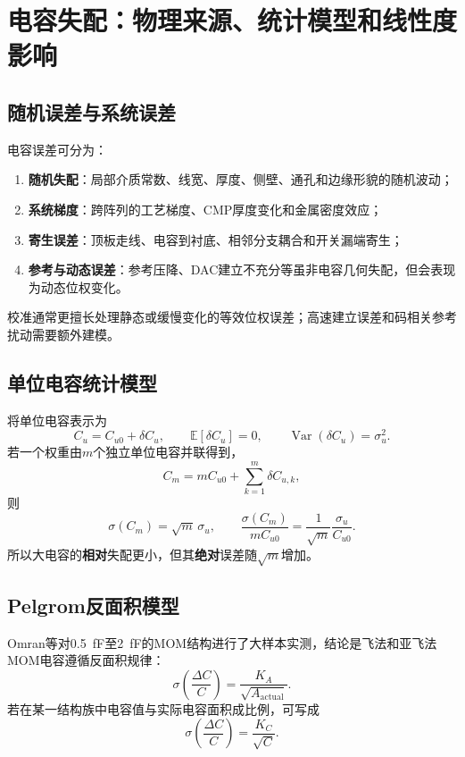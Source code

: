 \documentclass[UTF8,a4paper,11pt]{ctexart}
\newcommand{\sigc}{\sigma\!\left(\frac{\Delta C}{C}\right)}
\newcommand{\E}{\mathbb{E}}
\newcommand{\Var}{\operatorname{Var}}
\begin{document}
\section{电容失配：物理来源、统计模型和线性度影响}

\subsection{随机误差与系统误差}

电容误差可分为：
\begin{enumerate}
  \item \textbf{随机失配}：局部介质常数、线宽、厚度、侧壁、通孔和边缘形貌的随机波动；
  \item \textbf{系统梯度}：跨阵列的工艺梯度、CMP厚度变化和金属密度效应；
  \item \textbf{寄生误差}：顶板走线、电容到衬底、相邻分支耦合和开关漏端寄生；
  \item \textbf{参考与动态误差}：参考压降、DAC建立不充分等虽非电容几何失配，但会表现为动态位权变化。
\end{enumerate}
校准通常更擅长处理静态或缓慢变化的等效位权误差；高速建立误差和码相关参考扰动需要额外建模。

\subsection{单位电容统计模型}

将单位电容表示为
\begin{equation}
C_u=C_{u0}+\delta C_u,\qquad \E[\delta C_u]=0,
\qquad \Var(\delta C_u)=\sigma_u^2.
\end{equation}
若一个权重由$m$个独立单位电容并联得到，
\begin{equation}
C_m=mC_{u0}+\sum_{k=1}^{m}\delta C_{u,k},
\end{equation}
则
\begin{equation}
\sigma(C_m)=\sqrt{m}\,\sigma_u,
\qquad
\frac{\sigma(C_m)}{mC_{u0}}=\frac{1}{\sqrt m}\frac{\sigma_u}{C_{u0}}.
\label{eq:group_mismatch}
\end{equation}
所以大电容的\textbf{相对}失配更小，但其\textbf{绝对}误差随$\sqrt m$增加。

\subsection{Pelgrom反面积模型}

Omran等对\SI{0.5}{fF}至\SI{2}{fF}的MOM结构进行了大样本实测，结论是飞法和亚飞法MOM电容遵循反面积规律：\cite{omran2016}
\begin{equation}
\sigc=\frac{K_A}{\sqrt{A_{\mathrm{actual}}}}.
\label{eq:pelgrom_area}
\end{equation}
若在某一结构族中电容值与实际电容面积成比例，可写成
\begin{equation}
\sigc=\frac{K_C}{\sqrt C}.
\label{eq:pelgrom_cap}
\end{equation}
\end{document}
